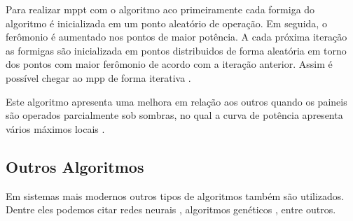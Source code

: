 Para realizar \gls{mppt} com o algoritmo \gls{aco} primeiramente cada formiga do algoritmo é inicializada em um ponto aleatório de operação. Em seguida, o ferômonio é aumentado nos pontos de maior potência. A cada próxima iteração as formigas são inicializada em pontos distribuidos de forma aleatória em torno dos pontos com maior ferômonio de acordo com a iteração anterior. Assim é possível chegar ao \gls{mpp} de forma iterativa \cite{jiang2013}.

Este algoritmo apresenta uma melhora em relação aos outros quando os paineis são operados parcialmente sob sombras, no qual a curva de potência apresenta vários máximos locais \cite{jiang2013}.

\subsection{Outros Algoritmos}

Em sistemas mais modernos outros tipos de algoritmos também são utilizados. Dentre eles podemos citar redes neurais \cite{elobaid2012}, algoritmos genéticos \cite{daraban2013}, entre outros.

